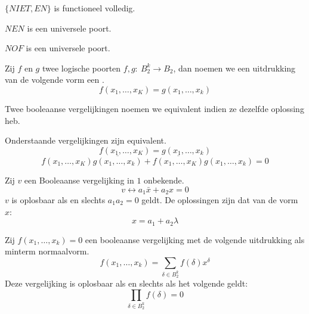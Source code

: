 \documentclass[main.tex]{subfiles}
\begin{document}
\begin{st}
  $\{NIET,EN\}$ is functioneel volledig.
\end{st}

\begin{st}
  $NEN$ is een universele poort.
\end{st}

\begin{st}
  $NOF$ is een universele poort.
\end{st}

\begin{de}
  Zij $f$ en $g$ twee logische poorten $f,g:\ B_{2}^{k}\rightarrow B_{2}$, dan noemen we een uitdrukking van de volgende vorm een .
  \[ f(x_{1},\dotsc,x_{K}) = g(x_{1},\dotsc,x_{k}) \]
\end{de}

\begin{de}
  Twee booleaanse vergelijkingen noemen we equivalent indien ze dezelfde oplossing heb.
\end{de}

\begin{st}
  Onderstaande vergelijkingen zijn equivalent.
  \[ f(x_{1},\dotsc,x_{K}) = g(x_{1},\dotsc,x_{k}) \]
  \[ f(x_{1},\dotsc,x_{K})\overline{g(x_{1},\dotsc,x_{k})} + \overline{f(x_{1},\dotsc,x_{K})}g(x_{1},\dotsc,x_{k}) = 0 \]
\end{st}

\begin{st}
  Zij $v$ een Booleaanse vergelijking in $1$ onbekende.
  \[ v \leftrightarrow a_{1}\bar{x} + a_{2}x = 0 \]
  $v$ is oplosbaar als en slechts $a_{1}a_{2} = 0$ geldt.
  De oplossingen zijn dat van de vorm $x$:
  \[ x = a_{1} + a_{2}\lambda \]
\end{st}

\begin{st}
  Zij $f(x_{1},\dotsc,x_{k}) = 0$ een booleaanse vergelijking met de volgende uitdrukking als minterm normaalvorm.
  \[ f(x_{1},\dotsc,x_{k}) = \sum_{\delta \in B_{2}^{k}}f(\delta)x^{\delta} \]
  Deze vergelijking is oplosbaar als en slechts als het volgende geldt:
  \[ \prod_{\delta\in B_{2}^{k}}f(\delta) = 0 \]
\end{st}
\end{document}
